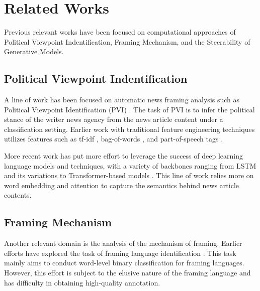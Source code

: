 \chapter{Related Works}

Previous relevant works have been focused on computational approaches of Political Viewpoint Indentification, Framing Mechanism, and the Steerability of Generative Models.

\section{Political Viewpoint Indentification}
A line of work has been focused on automatic news framing analysis such as Political Viewpoint Identification (PVI) \cite{PVI-survey,li-goldwasser-2021-using,kim-johnson-2022-close,matero-etal-2021-melt-message,li-caragea-2021-multi,yu2008classify,hoyland-etal-2014-predicting,biessmann2016pvi,duthie2016mining,baly-etal-2019-multi,li2017pvi-lstm,rao2016pvi-lstm,gangula-etal-2019-detecting,kummervold-etal-2021-operationalizing,baly-etal-2020-detect,luo-etal-2020-detecting}. The task of PVI is to infer the political stance of the writer news agency from the news article content under a classification setting. Earlier work with traditional feature engineering techniques utilizes features such as tf-idf \cite{yu2008classify}, bag-of-words \cite{yu2008classify,hoyland-etal-2014-predicting,biessmann2016pvi}, and part-of-speech tags \cite{hoyland-etal-2014-predicting,duthie2016mining,baly-etal-2019-multi}.

More recent work has put more effort to leverage the success of deep learning language models and techniques, with a variety of backbones ranging from LSTM and its variations \cite{li2017pvi-lstm,rao2016pvi-lstm,gangula-etal-2019-detecting} to Transformer-based models \cite{kummervold-etal-2021-operationalizing,baly-etal-2020-detect,luo-etal-2020-detecting}. This line of work relies more on word embedding and attention to capture the semantics behind news article contents.


\section{Framing Mechanism}
Another relevant domain is the analysis of the mechanism of framing. Earlier efforts have explored the task of framing language identification \cite{hamborg2020media,drakulich2015explicit,sap2019social,baumer-etal-2015-testing}. This task mainly aims to conduct word-level binary classification for framing languages. However, this effort is subject to the elusive nature of the framing language and has difficulty in obtaining high-quality annotation.

